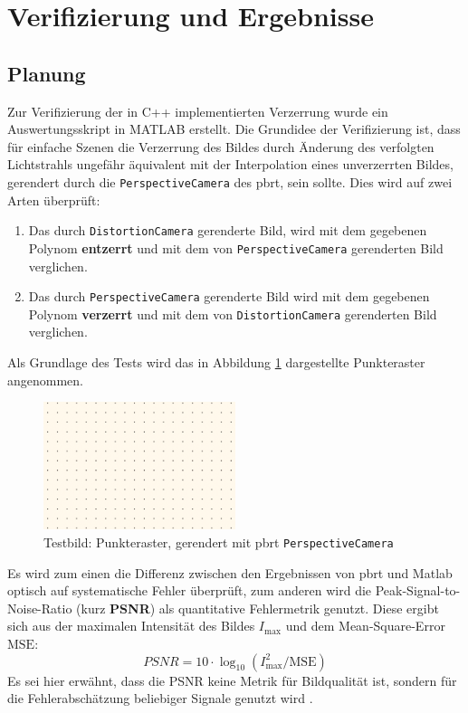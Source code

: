\newpage
\section{Verifizierung und Ergebnisse}
\subsection{Planung}
Zur Verifizierung der in C++ implementierten Verzerrung wurde ein Auswertungsskript in MATLAB erstellt. Die Grundidee der Verifizierung ist, dass für einfache Szenen die Verzerrung des Bildes durch Änderung des verfolgten Lichtstrahls ungefähr äquivalent mit der Interpolation eines unverzerrten Bildes, gerendert durch die \texttt{PerspectiveCamera} des pbrt, sein sollte.
Dies wird auf zwei Arten überprüft:
\begin{enumerate}
	\item Das durch \texttt{DistortionCamera} gerenderte Bild, wird mit dem gegebenen Polynom \textbf{entzerrt} und mit dem von \texttt{PerspectiveCamera} gerenderten Bild verglichen.
	\item Das durch \texttt{PerspectiveCamera} gerenderte Bild wird mit dem gegebenen Polynom \textbf{verzerrt} und mit dem von \texttt{DistortionCamera} gerenderten Bild verglichen.
\end{enumerate}

Als Grundlage des Tests wird das in Abbildung \ref{fig:test_img} dargestellte Punkteraster angenommen. 

\begin{figure}[h]
	\centering
	\includegraphics[width=0.5\textwidth]{img/dot_perspective.png}
	\caption{Testbild: Punkteraster, gerendert mit pbrt \texttt{PerspectiveCamera}}
	\label{fig:test_img}
\end{figure}

Es wird zum einen die Differenz zwischen den Ergebnissen von pbrt und Matlab optisch auf systematische Fehler überprüft, zum anderen wird die Peak-Signal-to-Noise-Ratio (kurz \textbf{PSNR}) als quantitative Fehlermetrik genutzt.
Diese ergibt sich aus der maximalen Intensität des Bildes $I_\text{max}$ und dem Mean-Square-Error $\text{MSE}$:
\begin{equation}
	PSNR = 10\cdot \log_{10} (I_\text{max}^2/\text{MSE})
\end{equation}
Es sei hier erwähnt, dass die PSNR keine Metrik für Bildqualität ist, sondern für die Fehlerabschätzung beliebiger Signale genutzt wird \cite{Akramullah2014}.


